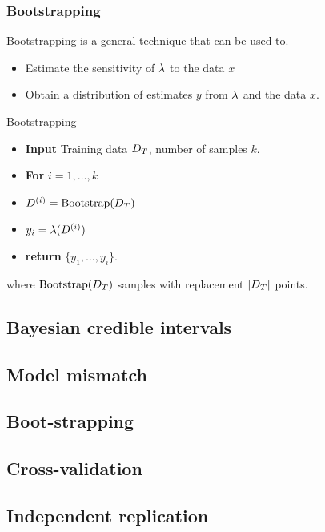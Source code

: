 \begin{frame}
  \frametitle{Bootstrapping}
  Bootstrapping is a general technique that can be used to.
  \begin{itemize}
  \item Estimate the sensitivity of $\lambda$ to the data $x$
  \item Obtain a distribution of estimates $y$ from $\lambda$ and the data $x$.
  \end{itemize}
  \begin{block}{Bootstrapping}
    \begin{itemize}
    \item \textbf{Input} Training data $D_T$, number of samples $k$.
    \item \textbf{For} $i = 1, \ldots, k$
    \item \quad $D^{(i)} = \textrm{Bootstrap}(D_T)$
    \item \quad $y_i = \lambda(D^{(i)})$
    \item \textbf{return} $\{y_1, \ldots, y_i\}$.
    \end{itemize}
    where  $\textrm{Bootstrap}(D_T)$ samples with replacement $|D_T|$ points.
  \end{block}

\end{frame}




\subsection{Bayesian credible intervals}


\subsection{Model mismatch}

\subsection{Boot-strapping}

\subsection{Cross-validation}

\subsection{Independent replication}




